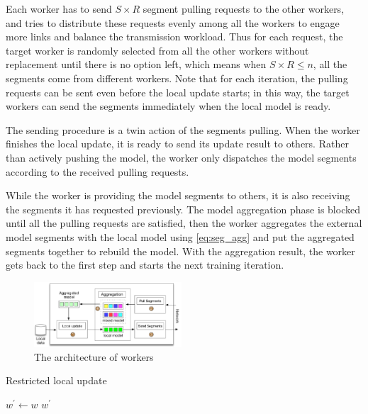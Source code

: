 Each worker has to send $S\times R$ segment pulling requests to the other workers, and \sys tries to distribute these requests evenly among all the workers to engage more links and balance the transmission workload. Thus for each request, the target worker is randomly selected from all the other workers without replacement until there is no option left, which means when $S\times R \leq n$, all the segments come from different workers. Note that for each iteration, the pulling requests can be sent even before the local update starts; in this way, the target workers can send the segments immediately when the local model is ready.

 The sending procedure is a twin action of the segments pulling. When the worker finishes the local update, it is ready to send its update result to others. Rather than actively pushing the model, the worker only dispatches the model segments according to the received pulling requests.

 While the worker is providing the model segments to others, it is also receiving the segments it has requested previously. The model aggregation phase is blocked until all the pulling requests are satisfied, then the worker aggregates the external model segments with the local model using \eqref{eq:seg_agg} and put the aggregated segments together to rebuild the model. With the aggregation result, the worker gets back to the first step and starts the next training iteration.


\begin{figure}[H]
\centering 
\includegraphics[width=0.49\textwidth]{pics/worker_arch.pdf}
\caption{The architecture of \sys workers}
\label{Fig: worker-arch}
\end{figure}











\begin{algorithm}
    \label{alg:restrict_update}
    \SetAlgoLined
    \caption{Restricted local update}
    $w^\prime \leftarrow w$\;
    \Return $w^\prime$
\end{algorithm}

